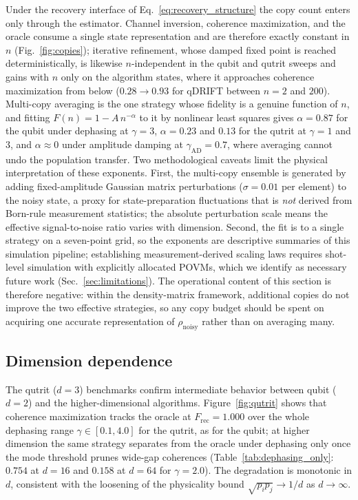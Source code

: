 \documentclass[12pt,a4paper]{article}
\newcommand{\Frec}{F_\mathrm{rec}}
\newcommand{\rhon}{\rho_\mathrm{noisy}}
\begin{document}
Under the recovery interface of Eq.~\eqref{eq:recovery_structure} the copy count enters only through the estimator.
Channel inversion, coherence maximization, and the oracle consume a single state representation and are therefore exactly constant in $n$ (Fig.~\ref{fig:copies}); iterative refinement, whose damped fixed point is reached deterministically, is likewise $n$-independent in the qubit and qutrit sweeps and gains with $n$ only on the algorithm states, where it approaches coherence maximization from below ($0.28 \to 0.93$ for qDRIFT between $n = 2$ and $200$).
Multi-copy averaging is the one strategy whose fidelity is a genuine function of $n$, and fitting $F(n) = 1 - A\,n^{-\alpha}$ to it by nonlinear least squares gives $\alpha = 0.87$ for the qubit under dephasing at $\gamma = 3$, $\alpha = 0.23$ and $0.13$ for the qutrit at $\gamma = 1$ and $3$, and $\alpha \approx 0$ under amplitude damping at $\gamma_\mathrm{AD} = 0.7$, where averaging cannot undo the population transfer.
Two methodological caveats limit the physical interpretation of these exponents.
First, the multi-copy ensemble is generated by adding fixed-amplitude Gaussian matrix perturbations ($\sigma = 0.01$ per element) to the noisy state, a proxy for state-preparation fluctuations that is \emph{not} derived from Born-rule measurement statistics; the absolute perturbation scale means the effective signal-to-noise ratio varies with dimension.
Second, the fit is to a single strategy on a seven-point grid, so the exponents are descriptive summaries of this simulation pipeline; establishing measurement-derived scaling laws requires shot-level simulation with explicitly allocated POVMs, which we identify as necessary future work (Sec.~\ref{sec:limitations}).
The operational content of this section is therefore negative: within the density-matrix framework, additional copies do not improve the two effective strategies, so any copy budget should be spent on acquiring one accurate representation of $\rhon$ rather than on averaging many.

\subsection{Dimension dependence}
\label{sec:dimension}

The qutrit ($d = 3$) benchmarks confirm intermediate behavior between qubit ($d = 2$) and the higher-dimensional algorithms.
Figure~\ref{fig:qutrit} shows that coherence maximization tracks the oracle at $\Frec = 1.000$ over the whole dephasing range $\gamma \in [0.1, 4.0]$ for the qutrit, as for the qubit; at higher dimension the same strategy separates from the oracle under dephasing only once the mode threshold prunes wide-gap coherences (Table~\ref{tab:dephasing_only}: $0.754$ at $d = 16$ and $0.158$ at $d = 64$ for $\gamma = 2.0$).
The degradation is monotonic in $d$, consistent with the loosening of the physicality bound $\sqrt{p_i p_j} \to 1/d$ as $d \to \infty$.
\end{document}
